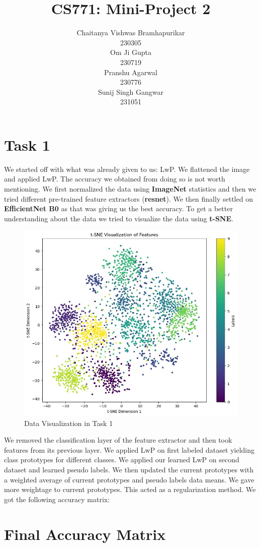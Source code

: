 \documentclass{article} %
\title{CS771: Mini-Project 2}
\author{
Chaitanya Vishwas Bramhapurikar \\
230305\\
\And
Om Ji Gupta\\
230719\\
\AND
Pranshu Agarwal \\
230776 \\
\And
Sunij Singh Gangwar \\
231051 \\
}
\begin{document}
\maketitle
\section{Task 1}
We started off with what was already given to us: LwP. We flattened the image and applied LwP. The accuracy we obtained from doing so is not worth mentioning. We first normalized the data using \textbf{ImageNet} statistics and then we tried different pre-trained feature extractors (\textbf{resnet}). We then finally settled on \textbf{EfficientNet B0} as that was giving us the best accuracy. To get a better understanding about the data we tried to visualize the data using \textbf{t-SNE}. 

\begin{figure}[h!]
    \centering
    \includegraphics[width=0.7\linewidth]{mini-project-2/Plots/task1-tSNE.jpg}
    \caption{Data Visualization in Task 1}
    \label{fig:enter-label}
\end{figure}

We removed the classification layer of the feature extractor and then took features from its previous layer. We applied LwP on first labeled dataset yielding class prototypes for different classes. We applied our learned LwP on second dataset and learned pseudo labels. We then updated the current prototypes with a weighted average of current prototypes and pseudo labels data means. We gave more weightage to current prototypes. This acted as a regularization method. We got the following accuracy matrix:
\section*{Final Accuracy Matrix}
\end{document}
